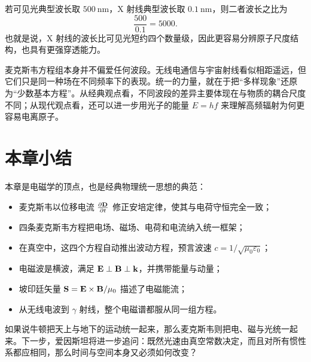 若可见光典型波长取 $500\ \text{nm}$，X 射线典型波长取 $0.1\ \text{nm}$，则二者波长之比为
\[
\frac{500}{0.1}=5000.
\]
也就是说，X 射线的波长比可见光短约四个数量级，因此更容易分辨原子尺度结构，也具有更强穿透能力。

\begin{remark}
麦克斯韦方程组本身并不偏爱任何波段。无线电通信与宇宙射线看似相距遥远，但它们只是同一种场在不同频率下的表现。统一的力量，就在于把“多样现象”还原为“少数基本方程”。从经典观点看，不同波段的差异主要体现在与物质的耦合尺度不同；从现代观点看，还可以进一步用光子的能量 $E=hf$ 来理解高频辐射为何更容易电离原子。
\end{remark}

\section*{本章小结}

本章是电磁学的顶点，也是经典物理统一思想的典范：
\begin{itemize}
  \item 麦克斯韦以位移电流 $\pdv{\vb{D}}{t}$ 修正安培定律，使其与电荷守恒完全一致；
  \item 四条麦克斯韦方程把电场、磁场、电荷和电流纳入统一框架；
  \item 在真空中，这四个方程自动推出波动方程，预言波速 $c=1/\sqrt{\mu_0\varepsilon_0}$；
  \item 电磁波是横波，满足 $\vb{E}\perp \vb{B}\perp \vb{k}$，并携带能量与动量；
  \item 坡印廷矢量 $\vb{S}=\vb{E}\times\vb{B}/\mu_0$ 描述了电磁能流；
  \item 从无线电波到 $\gamma$ 射线，整个电磁谱都服从同一组方程。
\end{itemize}

如果说牛顿把天上与地下的运动统一起来，那么麦克斯韦则把电、磁与光统一起来。下一步，爱因斯坦将进一步追问：既然光速由真空常数决定，而且对所有惯性系都应相同，那么时间与空间本身又必须如何改变？

